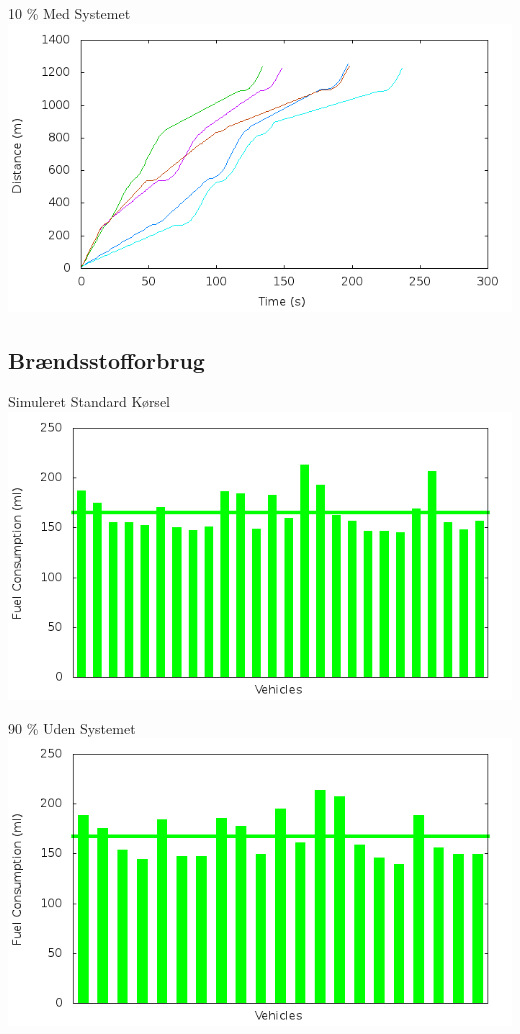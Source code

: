 \begin{frame}{10 \% Med Systemet}
\includegraphics[width=1\textwidth]{images/distanceControlled10.png}
\end{frame}

\subsection{Brændsstofforbrug}
\begin{frame}{Simuleret Standard Kørsel}
\includegraphics[width=1\textwidth]{images/fuelRouteUncontrolled0.png}
\end{frame}


\begin{frame}{90 \% Uden Systemet}
\includegraphics[width=1\textwidth]{images/fuelRouteUncontrolled10.png}
\end{frame}


